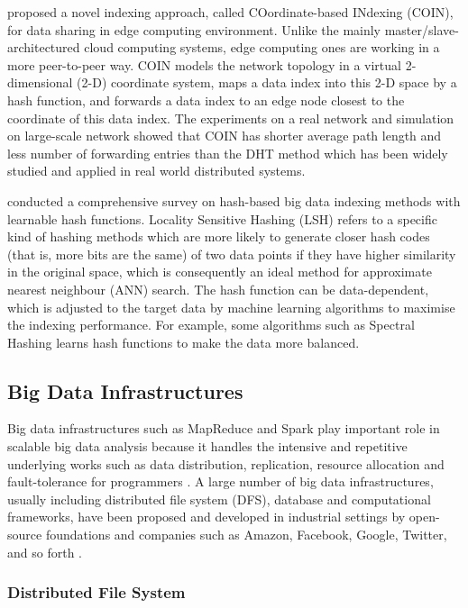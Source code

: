 \documentclass[conference]{IEEEtran}
\begin{document}
\textcite{xie2019} proposed a novel indexing approach, called
COordinate-based INdexing (COIN), for data sharing in edge computing
environment. Unlike the mainly master/slave-architectured cloud
computing systems, edge computing ones are working in a more
peer-to-peer way. COIN models the network topology in a virtual
2-dimensional (2-D) coordinate system, maps a data index into this 2-D
space by a hash function, and forwards a data index to an edge node
closest to the coordinate of this data index. The experiments on a real
network and simulation on large-scale network showed that COIN has
shorter average path length and less number of forwarding entries than
the DHT method which has been widely studied and applied in real world
distributed systems.

\textcite{Wang_2016} conducted a comprehensive survey on hash-based big
data indexing methods with learnable hash functions. Locality Sensitive
Hashing (LSH) refers to a specific kind of hashing methods which are
more likely to generate closer hash codes (that is, more bits are the
same) of two data points if they have higher similarity in the original
space, which is consequently an ideal method for approximate nearest
neighbour (ANN) search. The hash function can be data-dependent, which
is adjusted to the target data by machine learning algorithms to
maximise the indexing performance. For example, some algorithms such as
Spectral Hashing learns hash functions to make the data more balanced.

\hypertarget{big-data-infrastructures}{%
\subsection{Big Data Infrastructures}\label{big-data-infrastructures}}

Big data infrastructures such as MapReduce and Spark play important role
in scalable big data analysis because it handles the intensive and
repetitive underlying works such as data distribution, replication,
resource allocation and fault-tolerance for programmers
\autocite{Gupta2016}. A large number of big data infrastructures,
usually including distributed file system (DFS), database and
computational frameworks, have been proposed and developed in industrial
settings by open-source foundations and companies such as Amazon,
Facebook, Google, Twitter, and so forth \autocite{Gupta2016,Hewage2018}.

\hypertarget{distributed-file-system}{%
\subsubsection{Distributed File System}\label{distributed-file-system}}
\end{document}
